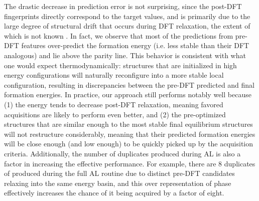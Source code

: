 %
%
%
The drastic decrease in prediction error is not surprising,
since the post-DFT fingerprints directly correspond to the target \DHf values,
and is primarily due to the large degree of structural drift that occurs during DFT relaxation,
the extent of which is not known .
%
In fact, we observe that most of the predictions from pre-DFT features over-predict the formation energy (i.e. less stable than their DFT analogous) and lie above the parity line.
%
This behavior is consistent with what one would expect thermodynamically:
structures that are initialized in high energy configurations will  naturally reconfigure into a more stable local configuration,
resulting in discrepancies between the pre-DFT predicted and final formation energies.
%
In practice, our approach still performs notably well because
(1) the energy tends to decrease post-DFT relaxation,
meaning favored acquisitions are likely to perform even better, and
(2) the pre-optimized structures that are similar enough to the most stable final equilibrium structures will not restructure considerably,
meaning that their predicted formation energies will be close enough (and low enough) to be quickly picked up by the acquisition criteria.
%
Additionally, the number of duplicates produced during AL is also a factor in increasing the effective performance.
%
For example, there are \num{8} duplicates of \aIrOthree produced during the full AL routine due to distinct pre-DFT candidates relaxing into the same energy basin,
and this over representation of \aIrOthree phase effectively increases the chance of it being acquired by a factor of eight.


